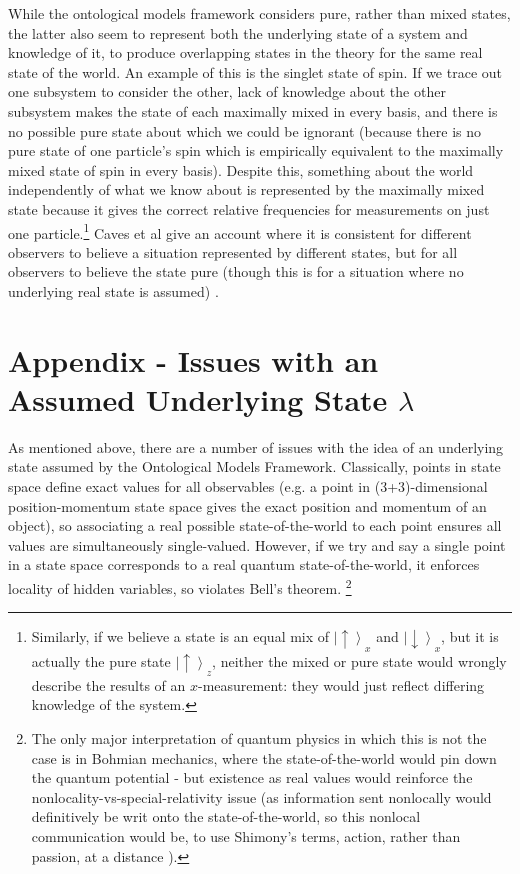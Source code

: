 \documentclass[superscriptaddress, floatfix,nofootinbib,12pt]{revtex4-2}
\newcommand{\ket}[1]{\left| #1 \right\rangle}
\newcommand{\upket}{\ket{\uparrow}}
\newcommand{\downket}{\ket{\downarrow}}
\begin{document}
While the ontological models framework considers pure, rather than mixed states, the latter also seem to represent both the underlying state of a system and knowledge of it, to produce overlapping states in the theory for the same real state of the world. An example of this is the singlet state of spin. If we trace out one subsystem to consider the other, lack of knowledge about the other subsystem makes the state of each maximally mixed in every basis, and there is no possible pure state about which we could be ignorant (because there is no pure state of one particle's spin which is empirically equivalent to the maximally mixed state of spin in every basis). Despite this, something about the world independently of what we know about is represented by the maximally mixed state because it gives the correct relative frequencies for measurements on just one particle.\footnote{Similarly, if we believe a state is an equal mix of $\upket_x$ and $\downket_x$, but it is actually the pure state $\upket_z$, neither the mixed or pure state would wrongly describe the results of an $x$-measurement: they would just reflect differing knowledge of the system.} Caves et al give an account where it is consistent for different observers to believe a situation represented by different states, but for all observers to believe the state pure (though this is for a situation where no underlying real state is assumed) \cite{Caves2002conditions}.

\section{Appendix - Issues with an Assumed Underlying State \texorpdfstring{$\lambda$}{lambda}}
As mentioned above, there are a number of issues with the idea of an underlying state assumed by the Ontological Models Framework. Classically, points in state space define exact values for all observables (e.g. a point in (3+3)-dimensional position-momentum state space gives the exact position and momentum of an object), so associating a real possible state-of-the-world to each point ensures all values are simultaneously single-valued. However, if we try and say a single point in a state space corresponds to a real quantum state-of-the-world, it enforces locality of hidden variables, so violates Bell's theorem. \footnote{The only major interpretation of quantum physics in which this is not the case is in Bohmian mechanics, where the state-of-the-world would pin down the quantum potential - but existence as real values would reinforce the nonlocality-vs-special-relativity issue (as information sent nonlocally would definitively be writ onto the state-of-the-world, so this nonlocal communication would be, to use Shimony's terms, action, rather than passion, at a distance \cite{Shimony1984Passion}).}
\end{document}
